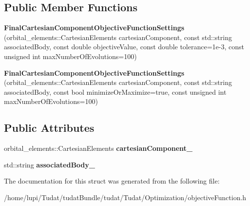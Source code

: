 \subsection*{Public Member Functions}
\begin{DoxyCompactItemize}
\item 
{\bfseries Final\+Cartesian\+Component\+Objective\+Function\+Settings} (orbital\+\_\+elements\+::\+Cartesian\+Elements cartesian\+Component, const std\+::string associated\+Body, const double objective\+Value, const double tolerance=1e-\/3, const unsigned int max\+Number\+Of\+Evolutions=100)\hypertarget{structtudat_1_1optimization_1_1FinalCartesianComponentObjectiveFunctionSettings_a96a008c00c7a415ad8e3a2d4bba3a0df}{}\label{structtudat_1_1optimization_1_1FinalCartesianComponentObjectiveFunctionSettings_a96a008c00c7a415ad8e3a2d4bba3a0df}

\item 
{\bfseries Final\+Cartesian\+Component\+Objective\+Function\+Settings} (orbital\+\_\+elements\+::\+Cartesian\+Elements cartesian\+Component, const std\+::string associated\+Body, const bool minimize\+Or\+Maximize=true, const unsigned int max\+Number\+Of\+Evolutions=100)\hypertarget{structtudat_1_1optimization_1_1FinalCartesianComponentObjectiveFunctionSettings_a0249e2b58f996413a55ff3d1f5633a10}{}\label{structtudat_1_1optimization_1_1FinalCartesianComponentObjectiveFunctionSettings_a0249e2b58f996413a55ff3d1f5633a10}

\end{DoxyCompactItemize}
\subsection*{Public Attributes}
\begin{DoxyCompactItemize}
\item 
orbital\+\_\+elements\+::\+Cartesian\+Elements {\bfseries cartesian\+Component\+\_\+}\hypertarget{structtudat_1_1optimization_1_1FinalCartesianComponentObjectiveFunctionSettings_ab293143c00ee8d3fc13cb1985c5ba95d}{}\label{structtudat_1_1optimization_1_1FinalCartesianComponentObjectiveFunctionSettings_ab293143c00ee8d3fc13cb1985c5ba95d}

\item 
std\+::string {\bfseries associated\+Body\+\_\+}\hypertarget{structtudat_1_1optimization_1_1FinalCartesianComponentObjectiveFunctionSettings_a9378d71d02e5198a355b4a356d5a7173}{}\label{structtudat_1_1optimization_1_1FinalCartesianComponentObjectiveFunctionSettings_a9378d71d02e5198a355b4a356d5a7173}

\end{DoxyCompactItemize}


The documentation for this struct was generated from the following file\+:\begin{DoxyCompactItemize}
\item 
/home/lupi/\+Tudat/tudat\+Bundle/tudat/\+Tudat/\+Optimization/objective\+Function.\+h\end{DoxyCompactItemize}
